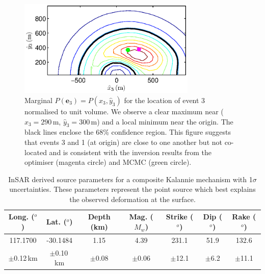 \documentclass[grl]{agutex}
\begin{document}
\begin{figure}
\noindent\includegraphics[width=20pc]{./diags/CopiedFromThesis/Kalannie_marginals2Dcont_param2_3.eps}
\caption{Marginal $P(\mathbf{e}_3) = P(\hat{x}_3,\hat{y}_3)$  for the location of event 3 normalised to unit volume.
We observe a clear maximum
near ($\hat{x}_3=290$\,m, $\hat{y}_3=300$\,m) and a local minimum near the origin. The black lines
enclose the 68\% confidence region. This figure suggests that events 3 and 1 (at origin) are close to one another but
not co-located and is consistent with the inversion results from the optimiser (magenta circle) and
MCMC (green circle).}
\label{fig:Kalannie-2Dmarginals_param23}
\end{figure}

\clearpage


\begin{table}
\caption[InSAR source parameters for composite Kalannie mechanism]
{\cite{dr_Dawson08a} InSAR derived source parameters for a composite Kalannie mechanism with 1$\sigma$ uncertainties.
These parameters represent the point source which best explains the observed deformation at the surface. }
\label{tab-Dawson-Kalannie-results}
\begin{tabular}{ccccccc}
\hline
Long. ($^o$) & Lat. ($^o$) & Depth (km) & Mag. ($M_w$) & Strike ($^o$) & Dip ($^o$) & Rake ($^o$) \\
\hline
117.1700 & -30.1484 & 1.15 & 4.39 & 231.1 & 51.9 & 132.6 \\
$\pm$0.12\,km &  $\pm$0.10\,km & $\pm$0.08 & $\pm$0.06 & $\pm$12.1 & $\pm$6.2 & $\pm$11.1 \\
\hline
\end{tabular}
\end{table}
\end{document}

